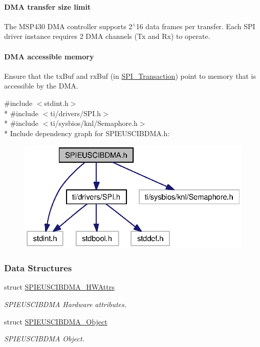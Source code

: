 \paragraph*{D\+M\+A transfer size limit}

The M\+S\+P430 D\+M\+A controller supports 2$^\wedge$16 data frames per transfer. Each S\+P\+I driver instance requires 2 D\+M\+A channels (Tx and Rx) to operate.

\paragraph*{D\+M\+A accessible memory}

Ensure that the tx\+Buf and rx\+Buf (in \hyperlink{struct_s_p_i___transaction}{S\+P\+I\+\_\+\+Transaction}) point to memory that is accessible by the D\+M\+A. 

{\ttfamily \#include $<$stdint.\+h$>$}\\*
{\ttfamily \#include $<$ti/drivers/\+S\+P\+I.\+h$>$}\\*
{\ttfamily \#include $<$ti/sysbios/knl/\+Semaphore.\+h$>$}\\*
Include dependency graph for S\+P\+I\+E\+U\+S\+C\+I\+B\+D\+M\+A.\+h\+:
\nopagebreak
\begin{figure}[H]
\begin{center}
\leavevmode
\includegraphics[width=322pt]{_s_p_i_e_u_s_c_i_b_d_m_a_8h__incl}
\end{center}
\end{figure}
\subsubsection*{Data Structures}
\begin{DoxyCompactItemize}
\item 
struct \hyperlink{struct_s_p_i_e_u_s_c_i_b_d_m_a___h_w_attrs}{S\+P\+I\+E\+U\+S\+C\+I\+B\+D\+M\+A\+\_\+\+H\+W\+Attrs}
\begin{DoxyCompactList}\small\item\em S\+P\+I\+E\+U\+S\+C\+I\+B\+D\+M\+A Hardware attributes. \end{DoxyCompactList}\item 
struct \hyperlink{struct_s_p_i_e_u_s_c_i_b_d_m_a___object}{S\+P\+I\+E\+U\+S\+C\+I\+B\+D\+M\+A\+\_\+\+Object}
\begin{DoxyCompactList}\small\item\em S\+P\+I\+E\+U\+S\+C\+I\+B\+D\+M\+A Object. \end{DoxyCompactList}\end{DoxyCompactItemize}
